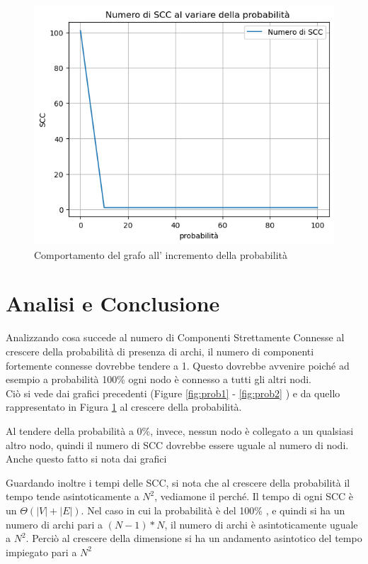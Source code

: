 \documentclass[12pt]{article}
\begin{document}
\begin{center}
\begin{figure}[H]
\includegraphics[width =\textwidth]{prob_and_scc}
\caption{Comportamento del grafo all' incremento della probabilità }
\label{fig:probscc}
\end{figure}
\end{center}

\section{Analisi e Conclusione}

Analizzando cosa succede al numero di Componenti Strettamente Connesse al crescere della probabilità di presenza di archi, il numero di componenti fortemente connesse dovrebbe tendere a 1. Questo dovrebbe avvenire poiché ad esempio a probabilità 100\% ogni nodo è connesso a tutti gli altri nodi. \\
Ciò si vede dai grafici precedenti (Figure \ref{fig:prob1} - \ref{fig:prob2} ) e da quello rappresentato in Figura \ref{fig:probscc} al crescere della probabilità.



Al tendere della probabilità a 0\%, invece, nessun nodo è collegato a un qualsiasi altro nodo, quindi 
il numero di SCC dovrebbe essere uguale al numero di nodi.\\
Anche questo fatto si nota dai grafici 


Guardando inoltre i tempi delle SCC, si nota che al crescere della probabilità
il tempo tende asintoticamente a $N^2$, vediamone il perché.
Il tempo di ogni SCC è un $\Theta(|V| + |E|)$.
Nel caso in cui la probabilità è del 100\% , e quindi si ha un numero di archi pari a 
$(N-1)*N$, il numero di archi è asintoticamente uguale a $N^2$.
Perciò al crescere della dimensione si ha un andamento asintotico del tempo impiegato pari a $N^2$
\end{document}

